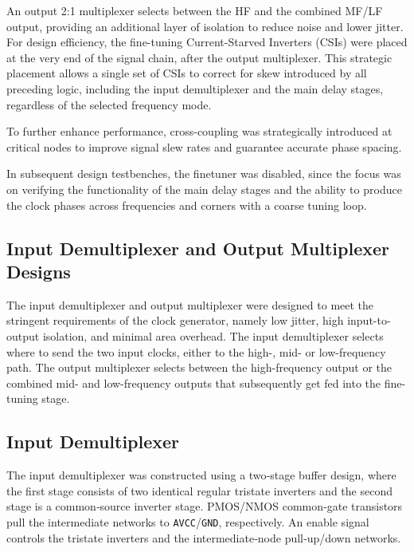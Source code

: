 An output 2:1 multiplexer selects between the HF and the combined MF/LF output, providing an additional layer of isolation to reduce noise and lower jitter. For design efficiency, the fine-tuning Current-Starved Inverters (CSIs) were placed at the very end of the signal chain, after the output multiplexer. This strategic placement allows a single set of CSIs to correct for skew introduced by all preceding logic, including the input demultiplexer and the main delay stages, regardless of the selected frequency mode.

To further enhance performance, cross-coupling was strategically introduced at critical nodes to improve signal slew rates and guarantee accurate phase spacing.

In subsequent design testbenches, the finetuner was disabled, since the focus was on verifying the functionality of the main delay stages and the ability to produce the clock phases across frequencies and corners with a coarse tuning loop.

\subsection*{Input Demultiplexer and Output Multiplexer Designs}\label{sec:demux_mux_design}

The input demultiplexer and output multiplexer were designed to meet the stringent requirements of the clock generator, namely low jitter, high input-to-output isolation, and minimal area overhead. The input demultiplexer selects where to send the two input clocks, either to the high-, mid- or low-frequency path. The output multiplexer selects between the high-frequency output or the combined mid- and low-frequency outputs that subsequently get fed into the fine-tuning stage.

\subsection{Input Demultiplexer}

The input demultiplexer was constructed using a two‑stage buffer design, where the first stage consists of two identical regular tristate inverters and the second stage is a common‑source inverter stage. PMOS/NMOS common‑gate transistors pull the intermediate networks to \texttt{AVCC}/\texttt{GND}, respectively. An enable signal controls the tristate inverters and the intermediate‑node pull‑up/down networks.

